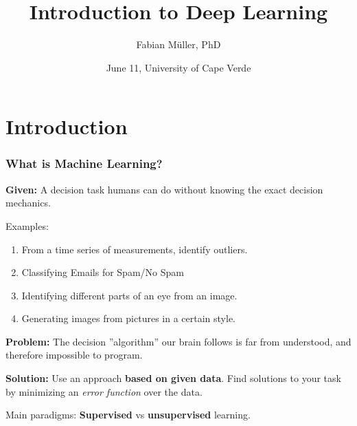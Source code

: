 \documentclass[10pt,hyperref={pdfpagelabels=false}]{beamer}
\title%
{Introduction to Deep Learning}
\author[ Fabian M\"uller]{Fabian M\"uller, PhD}
\institute{Ziemer Ophthalmic Systems in Bienne, Switzerland}
\date{June 11\nth 2019, University of Cape Verde}
\begin{document}
\frame[t,plain]{\titlepage}

\section{Introduction}
\begin{frame}
    \frametitle{What is Machine Learning?}
    \begin{itemize}
        \item {\bf Given:} A decision task humans can do without knowing the exact decision mechanics.
        {\small
        \item Examples:
            \begin{enumerate}
                \item From a time series of measurements, identify outliers.
                \item Classifying Emails for Spam/No Spam
                \item Identifying different parts of an eye from an image.
                \item Generating images from pictures in a certain style.
            \end{enumerate}
        }
        \item {\bf Problem:} The decision ''algorithm'' our brain follows is far from understood, and therefore impossible to program.
        \item {\bf Solution:} Use an approach {\bf based on given data}. Find solutions to your task by minimizing an \emph{error function} over the data.
        \item Main paradigms: {\bf Supervised} vs {\bf unsupervised} learning.
    \end{itemize}
\end{frame}
\end{document}

